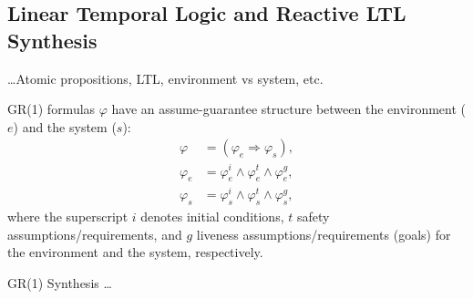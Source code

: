\subsection{Linear Temporal Logic and Reactive LTL Synthesis}\label{S:GR1}

\ldots Atomic propositions, LTL, environment vs system, etc.

GR(1) formulas $\varphi$ have an assume-guarantee structure between the environment ($e$) and the system ($s$):
\begin{equation}\label{GR1Formula}
\begin{split}
	\varphi &= (\varphi_e \Rightarrow \varphi_s),\\
	\varphi_e &= \varphi_e^i \wedge \varphi_e^t \wedge \varphi_e^g,\\
	\varphi_s &= \varphi_s^i \wedge \varphi_s^t \wedge \varphi_s^g,
\end{split}
\end{equation}
where the superscript $i$ denotes initial conditions, $t$ safety assumptions/requirements, and $g$ liveness assumptions/requirements (goals) for the environment and the system, respectively. 

GR(1) Synthesis \cite{piterman_06} \ldots

